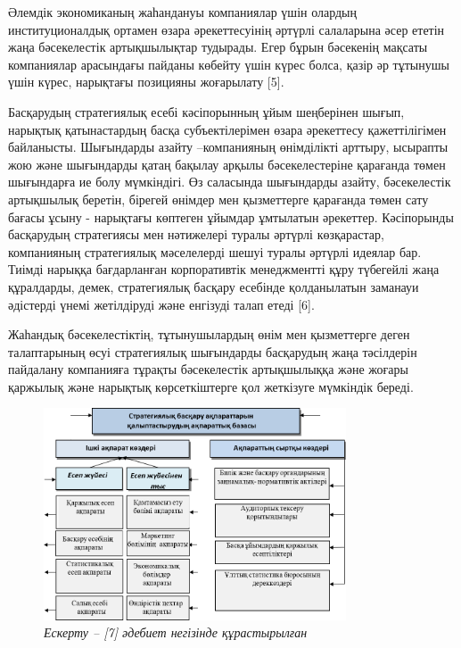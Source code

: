 \begin{multicols}{2}
Әлемдік экономиканың жаһандануы компаниялар үшін олардың
институционалдық ортамен өзара әрекеттесуінің әртүрлі салаларына әсер
ететін жаңа бәсекелестік артықшылықтар тудырады. Егер бұрын бәсекенің
мақсаты компаниялар арасындағы пайданы көбейту үшін күрес болса, қазір
әр тұтынушы үшін күрес, нарықтағы позицияны жоғарылату {[}5{]}.

Басқарудың стратегиялық есебі кәсіпорынның ұйым шеңберінен шығып,
нарықтық қатынастардың басқа субъектілерімен өзара әрекеттесу
қажеттілігімен байланысты. Шығындарды азайту --компанияның өнімділікті
арттыру, ысырапты жою және шығындарды қатаң бақылау арқылы
бәсекелестеріне қарағанда төмен шығындарға ие болу мүмкіндігі. Өз
саласында шығындарды азайту, бәсекелестік артықшылық беретін, бірегей
өнімдер мен қызметтерге қарағанда төмен сату бағасы ұсыну - нарықтағы
көптеген ұйымдар ұмтылатын әрекеттер. Кәсіпорынды басқарудың стратегиясы
мен нәтижелері туралы әртүрлі көзқарастар, компанияның стратегиялық
мәселелерді шешуі туралы әртүрлі идеялар бар. Тиімді нарыққа
бағдарланған корпоративтік менеджментті құру түбегейлі жаңа құралдарды,
демек, стратегиялық басқару есебінде қолданылатын заманауи әдістерді
үнемі жетілдіруді және енгізуді талап етеді {[}6{]}.

Жаһандық бәсекелестіктің, тұтынушылардың өнім мен қызметтерге деген
талаптарының өсуі стратегиялық шығындарды басқарудың жаңа тәсілдерін
пайдалану компанияға тұрақты бәсекелестік артықшылыққа және жоғары
қаржылық және нарықтық көрсеткіштерге қол жеткізуге мүмкіндік береді.
\end{multicols}

\begin{figure}[H]
	\centering
	\includegraphics[width=0.8\textwidth]{media/ekon4/image21}
	\caption*{2 - сурет. Стратегиялық басқару үшін ақпарат көздері}
	\caption*{\normalfont\emph{Ескерту -- {[}7{]} әдебиет негізінде құрастырылған}}
\end{figure}


